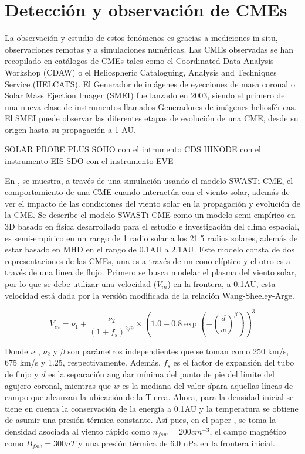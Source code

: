 \section{Detección y observación de CMEs}
La observación y estudio de estos fenómenos es gracias a mediciones in situ, observaciones remotas y a simulaciones numéricas.
Las \acp{CME} observadas se han recopilado en catálogos de \acp{CME} tales como el Coordinated Data Analysis Workshop (CDAW) o el Heliospheric Cataloguing, Analysis and Techniques Service (HELCATS).
El Generador de imágenes de eyecciones de masa coronal o Solar Mass Ejection Imager (SMEI) fue lanzado en 2003, siendo el primero de una nueva clase de instrumentos llamados Generadores de imágenes heliosféricas. El SMEI puede observar las diferentes etapas de evolución de una CME, desde su origen hasta su propagación a 1 AU.

SOLAR PROBE PLUS
SOHO con el intrumento CDS
HINODE con el instrumento EIS
SDO con el instrumento EVE

En \cite{mayank-2023}, se muestra, a través de una simulación usando el modelo SWASTi-CME, el comportamiento de una \ac{CME} cuando interactúa con el viento solar, además de ver el impacto de las condiciones del viento solar en la propagación y evolución de la CME. Se describe el modelo SWASTi-CME como un modelo semi-empírico en 3D basado en física desarrollado para el estudio e investigación del clima espacial, es semi-empirico en un rango de 1 radio solar a los 21.5 radios solares, además de estar basado en MHD en el rango de 0.1AU a 2.1AU. Este modelo consta de dos representaciones de las CMEs, una es a través de un cono elíptico y el otro es a través de una linea de flujo. Primero se busca modelar el plasma del viento solar, por lo que se debe utilizar una velocidad ($V_{in}$) en la frontera, a 0.1AU, esta velocidad está dada por la versión modificada de la relación Wang-Sheeley-Arge.

\begin{equation}
V_{in}=\nu_{1}+\frac{\nu_{2}}{(1+f_{s})^{2/9}}\times \left( 1.0-0.8\exp\left( -\left( \frac{d}{w}\right)^{\beta} \right)\right)^{3}
\end{equation}

Donde $\nu_1$, $\nu_2$ y $\beta$ son parámetros independientes que se toman como 250 km/s, 675 km/s y 1.25, respectivamente. Además, $f_s$ es el factor de expansión del tubo de flujo y $d$ es la separación angular mínima del punto de pie del límite del agujero coronal, mientras que $w$ es la mediana del valor $d$para aquellas líneas de campo que alcanzan la ubicación de la Tierra.
Ahora, para la densidad inicial se tiene en cuenta la conservación de la energía a 0.1AU y la temperatura se obtiene de asumir una presión térmica constante. Así pues, en el paper \cite{mayank-2022}, se toma la densidad asociada al viento rápido como $n_{fsw}=200 cm^{-3}$, el campo magnético como $B_{fsw}=300nT$ y una presión térmica de 6.0 nPa en la frontera inicial. 

